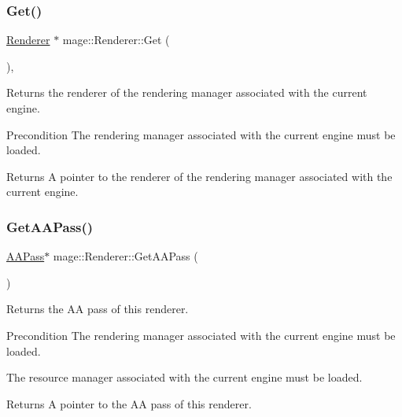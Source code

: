 \hypertarget{classmage_1_1_renderer_a401f8e17f60d8546b30de22943ac35db}{}\label{classmage_1_1_renderer_a401f8e17f60d8546b30de22943ac35db} 
\subsubsection{\texorpdfstring{Get()}{Get()}}
{\footnotesize\ttfamily \hyperlink{classmage_1_1_renderer}{Renderer} $\ast$ mage\+::\+Renderer\+::\+Get (\begin{DoxyParamCaption}{ }\end{DoxyParamCaption})\hspace{0.3cm}{\ttfamily [static]}, {\ttfamily [noexcept]}}

Returns the renderer of the rendering manager associated with the current engine.

\begin{DoxyPrecond}{Precondition}
The rendering manager associated with the current engine must be loaded. 
\end{DoxyPrecond}
\begin{DoxyReturn}{Returns}
A pointer to the renderer of the rendering manager associated with the current engine. 
\end{DoxyReturn}
\hypertarget{classmage_1_1_renderer_a52fd71822fe54161ad505a0361ec6c75}{}\label{classmage_1_1_renderer_a52fd71822fe54161ad505a0361ec6c75} 
\subsubsection{\texorpdfstring{Get\+A\+A\+Pass()}{GetAAPass()}}
{\footnotesize\ttfamily \hyperlink{classmage_1_1_a_a_pass}{A\+A\+Pass}$\ast$ mage\+::\+Renderer\+::\+Get\+A\+A\+Pass (\begin{DoxyParamCaption}{ }\end{DoxyParamCaption})}

Returns the AA pass of this renderer.

\begin{DoxyPrecond}{Precondition}
The rendering manager associated with the current engine must be loaded. 

The resource manager associated with the current engine must be loaded. 
\end{DoxyPrecond}
\begin{DoxyReturn}{Returns}
A pointer to the AA pass of this renderer. 
\end{DoxyReturn}
\hypertarget{classmage_1_1_renderer_a94e08d62790b3bfb1a12ae2ae657c5c2}{}\label{classmage_1_1_renderer_a94e08d62790b3bfb1a12ae2ae657c5c2} 
